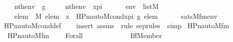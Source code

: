 \begin{isabellebody}
\ \ \ \ {\isachardoublequoteopen}nth{\isacharparenleft}{\kern0pt}{}{\isacharcomma}{\kern0pt}env{\isacharparenright}{\kern0pt}\ {\isacharequal}{\kern0pt}\ g{\isachardoublequoteclose}\ \isanewline
\ \ \ \ {\isachardoublequoteopen}nth{\isacharparenleft}{\kern0pt}{}{\isacharcomma}{\kern0pt}env{\isacharparenright}{\kern0pt}\ {\isacharequal}{\kern0pt}\ x{\isacharunderscore}{\kern0pt}pi{\isachardoublequoteclose}\ \ \isanewline
\ \ \ \ {\isachardoublequoteopen}env\ {\isasymin}\ list{\isacharparenleft}{\kern0pt}M{\isacharparenright}{\kern0pt}{\isachardoublequoteclose}\isanewline
\ \isanewline
\ \ \ \ {\isachardoublequoteopen}{\isacharparenleft}{\kern0pt}{\isasymforall}elem\ {\isasymin}\ M{\isachardot}{\kern0pt}\ elem\ {\isasymin}\ z\ {\isasymlongleftrightarrow}\ HPn{\isacharunderscore}{\kern0pt}auto{\isacharunderscore}{\kern0pt}M{\isacharunderscore}{\kern0pt}cond{\isacharparenleft}{\kern0pt}x{\isacharunderscore}{\kern0pt}pi{\isacharcomma}{\kern0pt}\ g{\isacharcomma}{\kern0pt}\ elem{\isacharparenright}{\kern0pt}{\isacharparenright}{\kern0pt}\isanewline
\ \ \ \ \ {\isasymlongleftrightarrow}\ sats{\isacharparenleft}{\kern0pt}M{\isacharcomma}{\kern0pt}{\isacharquery}{\kern0pt}fm{\isacharparenleft}{\kern0pt}{}{\isacharcomma}{\kern0pt}{}{\isacharcomma}{\kern0pt}{}{\isacharparenright}{\kern0pt}{\isacharcomma}{\kern0pt}env{\isacharparenright}{\kern0pt}{\isachardoublequoteclose}\isanewline
%
\isadelimproof
\ \ %
\endisadelimproof
%
\isatagproof
{}\isamarkupfalse%
\ HPn{\isacharunderscore}{\kern0pt}auto{\isacharunderscore}{\kern0pt}M{\isacharunderscore}{\kern0pt}cond{\isacharunderscore}{\kern0pt}def\isanewline
\ \ \isamarkupfalse%
\ {\isacharparenleft}{\kern0pt}insert\ assms\ {\isacharsemicolon}{\kern0pt}\ {\isacharparenleft}{\kern0pt}rule\ sep{\isacharunderscore}{\kern0pt}rules\ {\isacharbar}{\kern0pt}\ simp{\isacharparenright}{\kern0pt}{\isacharplus}{\kern0pt}{\isacharparenright}{\kern0pt}%
\endisatagproof
{\isafoldproof}%
%
\isadelimproof
\isanewline
%
\endisadelimproof
\isanewline
{}\isamarkupfalse%
\isanewline
\isanewline
{}\isamarkupfalse%
\ HPn{\isacharunderscore}{\kern0pt}auto{\isacharunderscore}{\kern0pt}M{\isacharunderscore}{\kern0pt}fm{\isacharprime}{\kern0pt}\ \ \isanewline
\ \ {\isachardoublequoteopen}HPn{\isacharunderscore}{\kern0pt}auto{\isacharunderscore}{\kern0pt}M{\isacharunderscore}{\kern0pt}fm{\isacharprime}{\kern0pt}\ {\isasymequiv}\ \isanewline
\ \ Forall\isanewline
\ \ \ \ \ \ \ \ \ \ \ \ \ {\isacharparenleft}{\kern0pt}Iff{\isacharparenleft}{\kern0pt}Member{\isacharparenleft}{\kern0pt}{}{\isacharcomma}{\kern0pt}\ {}{\isacharparenright}{\kern0pt}{\isacharcomma}{\kern0pt}\isanewline

\end{isabellebody}
